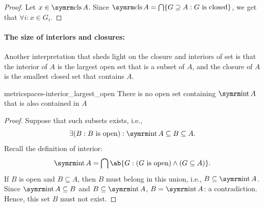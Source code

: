 \begin{proof}
  \forwarddir Let \(x \in \clos A\). Since
  \(\clos A = \bigcap \{G \supseteq A : G \textrm{ is closed}\}\), we get that
  \(\forall i : x \in G_i\).
\end{proof}
%
%
%

\paragraph{The size of interiors and closures:}

Another interpretation that sheds light on the closure and interiors of set is that the
interior of \(A\) is the largest open set that is a subset of \(A\), and the closure
of \(A\) is the smallest closed set that contains \(A\).

\begin{prop}{}{metricspaces-interior_largest_open}
  There is no open set containing \(\intr A\) that is also contained in \(A\)
\end{prop}

\begin{proof}
  Suppose that such subsets exists, i.e.,
  \begin{equation}
    \exists (B : B \textrm{ is open}) : \intr A \subseteq B \subseteq A.
  \end{equation}
  Recall the definition of interior:
  \begin{equation}
    \intr A = \bigcap \ab\{G : (G \textrm{ is open}) \land (G \subseteq A)\}.
  \end{equation}
  If \(B\) is open and \(B \subseteq A\), then \(B\) must belong in this union, i.e.,
  \(B \subseteq \intr A\). Since \(\intr A \subseteq B\) and \(B \subseteq \intr A\),
  \(B = \intr A\): a contradiction. Hence, this set \(B\) must not exist.
\end{proof}


